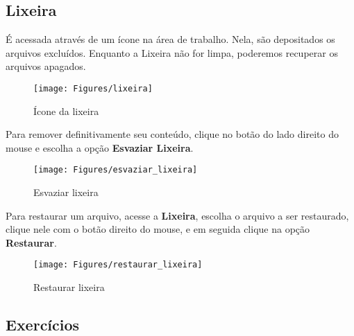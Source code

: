 \documentclass[hidelinks,12pt]{article}
\begin{document}
		\subsection{Lixeira}
		
		É acessada através de um ícone na área de trabalho. Nela, são depositados os arquivos excluídos. Enquanto a Lixeira não for limpa, poderemos recuperar os arquivos apagados.
		
		\begin{figure}[!h]
			\centering
			\texttt{[image: Figures/lixeira]}
			\caption{Ícone da lixeira}
			\label{fig:lixeira}
		\end{figure}
		\newpage
		Para remover definitivamente seu conteúdo, clique no botão do lado direito do mouse e escolha a opção {\bf Esvaziar Lixeira}.
		
		\begin{figure}[!h]
			\centering
			\texttt{[image: Figures/esvaziar\_lixeira]}
			\caption{Esvaziar lixeira}
			\label{fig:esvaziar_lixeira}
		\end{figure}
		
		Para restaurar um arquivo, acesse a {\bf Lixeira}, escolha o arquivo a ser restaurado, clique nele com o botão direito do mouse, e em seguida clique na opção {\bf Restaurar}.
		
		\begin{figure}[!h]
			\centering
			\texttt{[image: Figures/restaurar\_lixeira]}
			\caption{Restaurar lixeira}
			\label{fig: restaurar_lixeira}
		\end{figure}
		
		\subsection{Exercícios}
		
\end{document}
